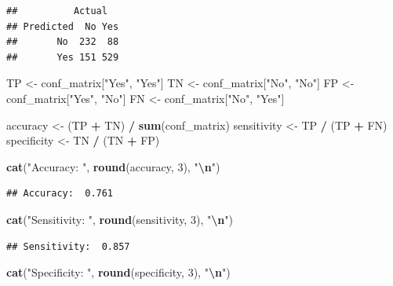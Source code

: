 \documentclass[
]{article}
\newenvironment{Shaded}{\begin{snugshade}}{\end{snugshade}}
\newcommand{\DecValTok}[1]{\textcolor[rgb]{0.00,0.00,0.81}{#1}}
\newcommand{\FunctionTok}[1]{\textcolor[rgb]{0.13,0.29,0.53}{\textbf{#1}}}
\newcommand{\NormalTok}[1]{#1}
\newcommand{\OtherTok}[1]{\textcolor[rgb]{0.56,0.35,0.01}{#1}}
\newcommand{\SpecialCharTok}[1]{\textcolor[rgb]{0.81,0.36,0.00}{\textbf{#1}}}
\newcommand{\StringTok}[1]{\textcolor[rgb]{0.31,0.60,0.02}{#1}}
\begin{document}
\begin{verbatim}
##          Actual
## Predicted  No Yes
##       No  232  88
##       Yes 151 529
\end{verbatim}

\begin{Shaded}
\begin{Highlighting}[]
\NormalTok{TP }\OtherTok{\textless{}{-}}\NormalTok{ conf\_matrix[}\StringTok{"Yes"}\NormalTok{, }\StringTok{"Yes"}\NormalTok{]}
\NormalTok{TN }\OtherTok{\textless{}{-}}\NormalTok{ conf\_matrix[}\StringTok{"No"}\NormalTok{, }\StringTok{"No"}\NormalTok{]}
\NormalTok{FP }\OtherTok{\textless{}{-}}\NormalTok{ conf\_matrix[}\StringTok{"Yes"}\NormalTok{, }\StringTok{"No"}\NormalTok{]}
\NormalTok{FN }\OtherTok{\textless{}{-}}\NormalTok{ conf\_matrix[}\StringTok{"No"}\NormalTok{, }\StringTok{"Yes"}\NormalTok{]}

\NormalTok{accuracy }\OtherTok{\textless{}{-}}\NormalTok{ (TP }\SpecialCharTok{+}\NormalTok{ TN) }\SpecialCharTok{/} \FunctionTok{sum}\NormalTok{(conf\_matrix)}
\NormalTok{sensitivity }\OtherTok{\textless{}{-}}\NormalTok{ TP }\SpecialCharTok{/}\NormalTok{ (TP }\SpecialCharTok{+}\NormalTok{ FN)}
\NormalTok{specificity }\OtherTok{\textless{}{-}}\NormalTok{ TN }\SpecialCharTok{/}\NormalTok{ (TN }\SpecialCharTok{+}\NormalTok{ FP)}

\FunctionTok{cat}\NormalTok{(}\StringTok{"Accuracy: "}\NormalTok{, }\FunctionTok{round}\NormalTok{(accuracy, }\DecValTok{3}\NormalTok{), }\StringTok{"}\SpecialCharTok{\textbackslash{}n}\StringTok{"}\NormalTok{)}
\end{Highlighting}
\end{Shaded}

\begin{verbatim}
## Accuracy:  0.761
\end{verbatim}

\begin{Shaded}
\begin{Highlighting}[]
\FunctionTok{cat}\NormalTok{(}\StringTok{"Sensitivity: "}\NormalTok{, }\FunctionTok{round}\NormalTok{(sensitivity, }\DecValTok{3}\NormalTok{), }\StringTok{"}\SpecialCharTok{\textbackslash{}n}\StringTok{"}\NormalTok{)}
\end{Highlighting}
\end{Shaded}

\begin{verbatim}
## Sensitivity:  0.857
\end{verbatim}

\begin{Shaded}
\begin{Highlighting}[]
\FunctionTok{cat}\NormalTok{(}\StringTok{"Specificity: "}\NormalTok{, }\FunctionTok{round}\NormalTok{(specificity, }\DecValTok{3}\NormalTok{), }\StringTok{"}\SpecialCharTok{\textbackslash{}n}\StringTok{"}\NormalTok{)}
\end{Highlighting}
\end{Shaded}
\end{document}
